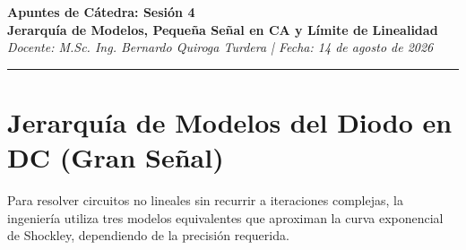 \documentclass[11pt, a4paper]{article}
\begin{document}
\begin{center}
    {\LARGE \textbf{Apuntes de Cátedra: Sesión 4}}\\[0.3cm]
    {\large \textbf{Jerarquía de Modelos, Pequeña Señal en CA y Límite de Linealidad}}\\
    \textit{Docente: M.Sc. Ing. Bernardo Quiroga Turdera \quad | \quad Fecha: 14 de agosto de 2026}
    \vspace{0.3cm}
    \hrule
\end{center}

\vspace{0.3cm}

\section{Jerarquía de Modelos del Diodo en DC (Gran Señal)}
Para resolver circuitos no lineales sin recurrir a iteraciones complejas, la ingeniería utiliza tres modelos equivalentes que aproximan la curva exponencial de Shockley, dependiendo de la precisión requerida.

\vspace{0.3cm}
\end{document}
